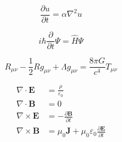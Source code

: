 \begin{equation}
\frac{\partial u}{\partial t} = \alpha \nabla^2 u
\end{equation}

\begin{equation}
i\hbar \frac{\partial}{\partial t} \Psi = \hat{H} \Psi
\end{equation}

\begin{equation}
R_{\mu\nu} - \frac{1}{2}Rg_{\mu\nu} + \Lambda g_{\mu\nu} = \frac{8\pi G}{c^4} T_{\mu\nu}
\end{equation}

\begin{align}
\nabla \cdot \mathbf{E} &= \frac{\rho}{\varepsilon_0} \\
\nabla \cdot \mathbf{B} &= 0 \\
\nabla \times \mathbf{E} &= -\frac{\partial \mathbf{B}}{\partial t} \\
\nabla \times \mathbf{B} &= \mu_0 \mathbf{J} + \mu_0 \varepsilon_0 \frac{\partial \mathbf{E}}{\partial t}
\end{align}

